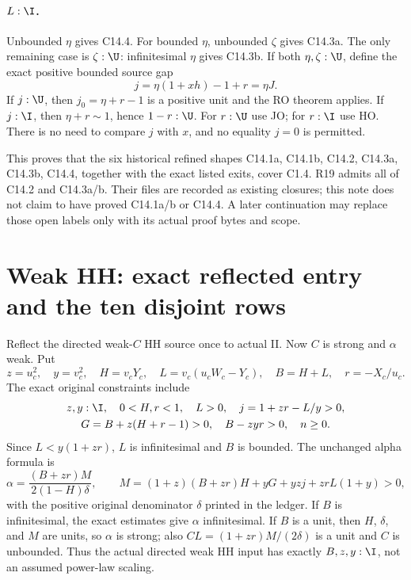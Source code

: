 \paragraph{$L:\I$.}
Unbounded $\eta$ gives C14.4. For bounded $\eta$, unbounded $\zeta$
gives C14.3a. The only remaining case is $\zeta:\U$: infinitesimal
$\eta$ gives C14.3b. If both $\eta,\zeta:\U$, define the exact
positive bounded source gap
\[
j=\eta(1+xh)-1+r=\eta J.
\]
If $j:\U$, then $j_0=\eta+r-1$ is a positive unit and the RO theorem
applies. If $j:\I$, then $\eta+r\sim1$, hence $1-r:\U$.
For $r:\U$ use JO; for $r:\I$ use HO. There is no need to compare
$j$ with $x$, and no equality $j=0$ is permitted.

This proves that the six historical refined shapes
C14.1a, C14.1b, C14.2, C14.3a, C14.3b, C14.4, together with the exact
listed exits, cover C1.4. R19 admits all of C14.2 and C14.3a/b.
Their files are recorded as existing closures; this note does not claim
to have proved C14.1a/b or C14.4. A later continuation may replace
those open labels only with its actual proof bytes and scope.

\section{Weak HH: exact reflected entry and the ten disjoint rows}

Reflect the directed weak-$C$ HH source once to actual II. Now $C$
is strong and $\alpha$ weak. Put
\[
z=u_c^2,\quad y=v_c^2,\quad H=v_cY_c,\quad
L=v_c(u_cW_c-Y_c),\quad B=H+L,\quad r=-X_c/u_c.
\]
The exact original constraints include
\begin{gather*}
z,y:\I,\quad 0<H,r<1,\quad L>0,\quad j=1+zr-L/y>0,\\
G=B+z(H+r-1)>0,\quad B-zyr>0,\quad n\ge0.
\end{gather*}
Since $L<y(1+zr)$, $L$ is infinitesimal and $B$ is bounded.
The unchanged alpha formula is
\[
\alpha=\frac{(B+zr)M}{2(1-H)\delta},\qquad
M=(1+z)(B+zr)H+yG+yzj+zrL(1+y)>0,
\]
with the positive original denominator $\delta$ printed in the ledger.
If $B$ is infinitesimal, the exact estimates give $\alpha$ infinitesimal.
If $B$ is a unit, then $H$, $\delta$, and $M$ are units, so $\alpha$
is strong; also $CL=(1+zr)M/(2\delta)$ is a unit and $C$ is
unbounded. Thus the actual directed weak HH input has exactly
$B,z,y:\I$, not an assumed power-law scaling.

